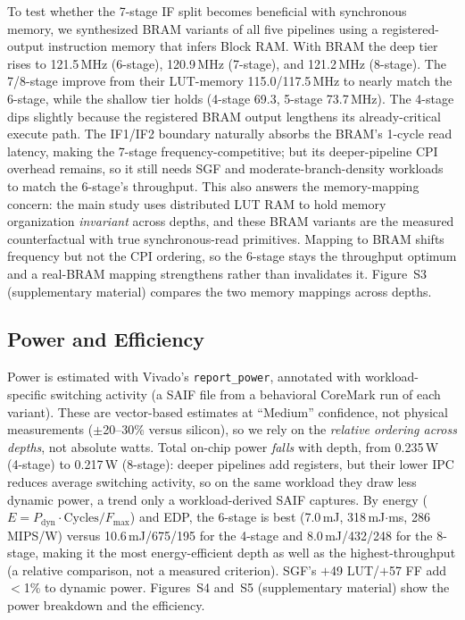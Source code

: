 \documentclass[acmsmall,nonacm,screen]{acmart}
\begin{document}
To test whether the 7-stage IF split becomes beneficial with synchronous memory, we synthesized BRAM variants of all five pipelines using a registered-output instruction memory that infers Block RAM.
With BRAM the deep tier rises to 121.5\,MHz (6-stage), 120.9\,MHz (7-stage), and 121.2\,MHz (8-stage). The 7/8-stage improve from their LUT-memory 115.0/117.5\,MHz to nearly match the 6-stage, while the shallow tier holds (4-stage 69.3, 5-stage 73.7\,MHz). The 4-stage dips slightly because the registered BRAM output lengthens its already-critical execute path.
The IF1/IF2 boundary naturally absorbs the BRAM's 1-cycle read latency, making the 7-stage frequency-competitive; but its deeper-pipeline CPI overhead remains, so it still needs SGF and moderate-branch-density workloads to match the 6-stage's throughput.
This also answers the memory-mapping concern: the main study uses distributed LUT RAM to hold memory organization \emph{invariant} across depths, and these BRAM variants are the measured counterfactual with true synchronous-read primitives. Mapping to BRAM shifts frequency but not the CPI ordering, so the 6-stage stays the throughput optimum and a real-BRAM mapping strengthens rather than invalidates it.
Figure~S3 (supplementary material) compares the two memory mappings across depths.

\subsection{Power and Efficiency}
\label{sec:power}

Power is estimated with Vivado's \texttt{report\_power}, annotated with workload-specific switching activity (a SAIF file from a behavioral CoreMark run of each variant). These are vector-based estimates at ``Medium'' confidence, not physical measurements ($\pm$20--30\% versus silicon), so we rely on the \emph{relative ordering across depths}, not absolute watts. Total on-chip power \emph{falls} with depth, from 0.235\,W (4-stage) to 0.217\,W (8-stage): deeper pipelines add registers, but their lower IPC reduces average switching activity, so on the same workload they draw less dynamic power, a trend only a workload-derived SAIF captures.
By energy ($E = P_{\text{dyn}}\cdot\text{Cycles}/F_{\max}$) and EDP, the 6-stage is best (7.0\,mJ, 318\,mJ$\cdot$ms, 286\,MIPS/W) versus 10.6\,mJ/675/195 for the 4-stage and 8.0\,mJ/432/248 for the 8-stage, making it the most energy-efficient depth as well as the highest-throughput (a relative comparison, not a measured criterion). SGF's $+$49 LUT/$+$57 FF add $<$1\% to dynamic power. Figures~S4 and~S5 (supplementary material) show the power breakdown and the efficiency.
\end{document}
